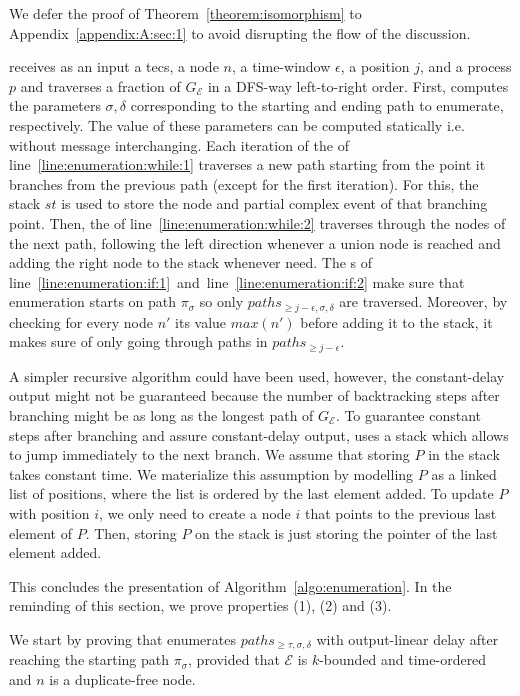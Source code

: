 We defer the proof of Theorem~\ref{theorem:isomorphism} to Appendix~\ref{appendix:A:sec:1} to avoid disrupting the flow of the discussion.

 receives as an input a \acrshort{tecs}, a node $n$, a time-window $\epsilon$, a position $j$, and a process $p$ and traverses a fraction of $G_{\mathcal{E}}$ in a DFS-way left-to-right order. First, computes the parameters $\sigma, \delta$ corresponding to the starting and ending path to enumerate, respectively. The value of these parameters can be computed statically i.e. without message interchanging.  Each iteration of the  of line~\ref{line:enumeration:while:1} traverses a new path starting from the point it branches from the previous path (except for the first iteration). For this, the stack $st$ is used to store the node and partial complex event of that branching point. Then, the  of line~\ref{line:enumeration:while:2} traverses through the nodes of the next path, following the left direction whenever a union node is reached and adding the right node to the stack whenever need. The s of line~\ref{line:enumeration:if:1}~and~line~\ref{line:enumeration:if:2} make sure that enumeration starts on path $\pi_{\sigma}$ so only $paths_{\ge j - \epsilon, \sigma, \delta}$ are traversed. Moreover, by checking for every node $n'$ its value $max(n')$ before adding it to the stack, it makes sure of only going through paths in $paths_{\ge j - \epsilon}$.

A simpler recursive algorithm could have been used, however, the constant-delay output might not be guaranteed because the number of backtracking steps after branching might be as long as the longest path of $G_{\mathcal{E}}$. To guarantee constant steps after branching and assure constant-delay output,  uses a stack which allows to jump immediately to the next branch. We assume that storing $P$ in the stack takes constant time. We materialize this assumption by modelling $P$ as a linked list of positions, where the list is ordered by the last element added. To update $P$ with position $i$, we only need to create a node $i$ that points to the previous last element of $P$. Then, storing $P$ on the stack is just storing the pointer of the last element added.

This concludes the presentation of Algorithm~\ref{algo:enumeration}. In the reminding of this section, we prove properties (1), (2) and (3).

We start by proving that  enumerates $paths_{\ge \tau, \sigma, \delta}$ with output-linear delay after reaching the starting path $\pi_{\sigma}$, provided that $\mathcal{E}$ is $k$-bounded and time-ordered and $n$ is a duplicate-free node.

